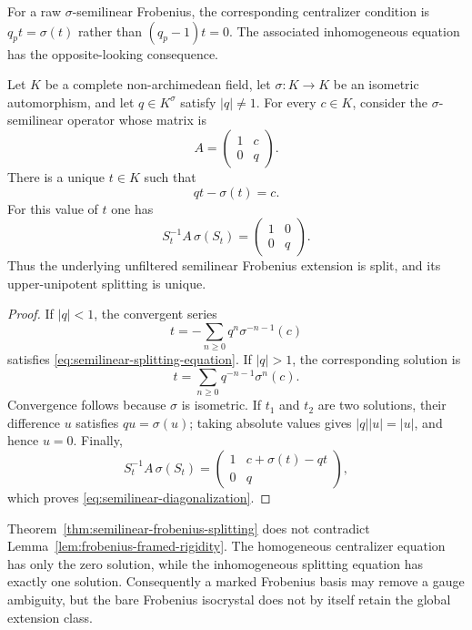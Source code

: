 For a raw $\sigma$-semilinear Frobenius, the corresponding centralizer
condition is $q_pt=\sigma(t)$ rather than $(q_p-1)t=0$.  The associated
inhomogeneous equation has the opposite-looking consequence.

\begin{theorem}
\label{thm:semilinear-frobenius-splitting}
Let $K$ be a complete non-archimedean field, let
$\sigma\colon K\to K$ be an isometric automorphism, and let
$q\in K^\sigma$ satisfy $|q|\ne1$.  For every $c\in K$, consider the
$\sigma$-semilinear operator whose matrix is
\[
 A=\begin{pmatrix}1&c\\0&q\end{pmatrix}.
\]
There is a unique $t\in K$ such that
\begin{equation}\label{eq:semilinear-splitting-equation}
 qt-\sigma(t)=c.
\end{equation}
For this value of $t$ one has
\begin{equation}\label{eq:semilinear-diagonalization}
 S_t^{-1}A\,\sigma(S_t)
 =\begin{pmatrix}1&0\\0&q\end{pmatrix}.
\end{equation}
Thus the underlying unfiltered semilinear Frobenius extension is split, and
its upper-unipotent splitting is unique.
\end{theorem}

\begin{proof}
If $|q|<1$, the convergent series
\[
 t=-\sum_{n\ge0}q^n\sigma^{-n-1}(c)
\]
satisfies \eqref{eq:semilinear-splitting-equation}.  If $|q|>1$, the
corresponding solution is
\[
 t=\sum_{n\ge0}q^{-n-1}\sigma^n(c).
\]
Convergence follows because $\sigma$ is isometric.  If $t_1$ and $t_2$ are
two solutions, their difference $u$ satisfies $qu=\sigma(u)$; taking
absolute values gives $|q||u|=|u|$, and hence $u=0$.  Finally,
\[
 S_t^{-1}A\,\sigma(S_t)
 =\begin{pmatrix}1&c+\sigma(t)-qt\\0&q\end{pmatrix},
\]
which proves \eqref{eq:semilinear-diagonalization}.
\end{proof}

Theorem~\ref{thm:semilinear-frobenius-splitting} does not contradict
Lemma~\ref{lem:frobenius-framed-rigidity}.  The homogeneous centralizer
equation has only the zero solution, while the inhomogeneous splitting
equation has exactly one solution.  Consequently a marked Frobenius basis
may remove a gauge ambiguity, but the bare Frobenius isocrystal does not by
itself retain the global extension class.

